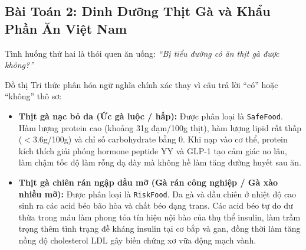 \documentclass[12pt,a4paper]{report}
\begin{document}
\subsection{Bài Toán 2: Dinh Dưỡng Thịt Gà và Khẩu Phần Ăn Việt Nam}
Tình huống thứ hai là thói quen ăn uống: \textit{“Bị tiểu đường có ăn thịt gà được không?”}

Đồ thị Tri thức phân hóa ngữ nghĩa chính xác thay vì câu trả lời “có” hoặc “không” thô sơ:
\begin{itemize}[itemsep=1pt, parsep=0pt, topsep=2pt]
    \item \textbf{Thịt gà nạc bỏ da (Ức gà luộc / hấp):} Được phân loại là \texttt{SafeFood}. Hàm lượng protein cao (khoảng 31g đạm/100g thịt), hàm lượng lipid rất thấp ($< 3.6$g/100g) và chỉ số carbohydrate bằng 0. Khi nạp vào cơ thể, protein kích thích giải phóng hormone peptide YY và GLP-1 tạo cảm giác no lâu, làm chậm tốc độ làm rỗng dạ dày mà không hề làm tăng đường huyết sau ăn.
    \item \textbf{Thịt gà chiên rán ngập dầu mỡ (Gà rán công nghiệp / Gà xào nhiều mỡ):} Được phân loại là \texttt{RiskFood}. Da gà và dầu chiên ở nhiệt độ cao sinh ra các acid béo bão hòa và chất béo dạng trans. Các acid béo tự do dư thừa trong máu làm phong tỏa tín hiệu nội bào của thụ thể insulin, làm trầm trọng thêm tình trạng đề kháng insulin tại cơ bắp và gan, đồng thời làm tăng nồng độ cholesterol LDL gây biến chứng xơ vữa động mạch vành.
\end{itemize}
\end{document}
